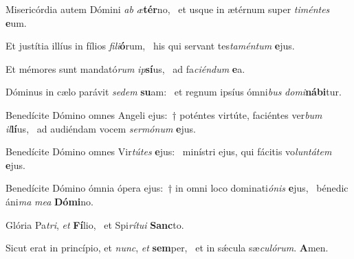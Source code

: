 \item Misericórdia autem Dómini \textit{ab} \textit{æ}\textbf{tér}no,~\psstar{} et usque in ætérnum super \textit{timéntes} \textbf{e}um.
\item Et justítia illíus in fílios \textit{fili}\textbf{ó}rum,~\psstar{} his qui servant tes\textit{taméntum} \textbf{e}jus.
\item Et mémores sunt mandató\textit{rum} \textit{ip}\textbf{sí}us,~\psstar{} ad fa\textit{ciéndum} \textbf{e}a.
\item Dóminus in cælo parávit \textit{sedem} \textbf{su}am:~\psstar{} et regnum ipsíus ómni\textit{bus} \textit{domi}\textbf{ná}\textbf{bi}tur.
\item Benedícite Dómino omnes Angeli ejus:~† poténtes virtúte, faciéntes ver\textit{bum} \textit{il}\textbf{lí}us,~\psstar{} ad audiéndam vocem \textit{sermónum} \textbf{e}jus.
\item Benedícite Dómino omnes Vir\textit{tútes} \textbf{e}jus:~\psstar{} minístri ejus, qui fácitis vo\textit{luntátem} \textbf{e}jus.
\item Benedícite Dómino ómnia ópera ejus:~† in omni loco dominati\textit{ónis} \textbf{e}jus,~\psstar{} bénedic áni\textit{ma} \textit{mea} \textbf{Dó}\textbf{mi}no.
\item Glória Pa\textit{tri}, \textit{et} \textbf{Fí}lio,~\psstar{} et Spi\textit{rítui} \textbf{Sanc}to.
\item Sicut erat in princípio, et \textit{nunc}, \textit{et} \textbf{sem}per,~\psstar{} et in sǽcula sæ\textit{culórum}. \textbf{A}men.
